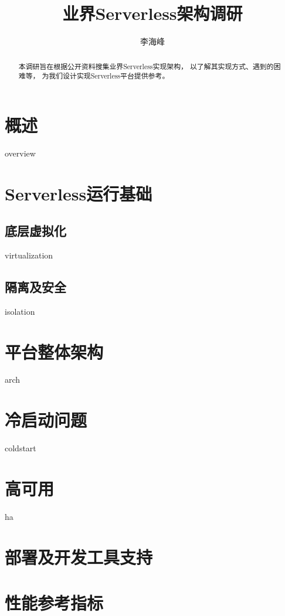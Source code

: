 \documentclass{scrartcl}
\title{业界Serverless架构调研}
\author{李海峰}
\begin{document}
\begin{titlingpage}
\maketitle
\begin{abstract}
    本调研旨在根据公开资料搜集业界Serverless实现架构，
    以了解其实现方式、遇到的困难等，
    为我们设计实现Serverless平台提供参考。
\end{abstract}
\end{titlingpage}
\tableofcontents

\section{概述}
{overview}
\section{Serverless运行基础}
\subsection{底层虚拟化}
{virtualization}
\subsection{隔离及安全}
{isolation}
\section{平台整体架构}
{arch}
\section{冷启动问题}
{coldstart}
\section{高可用}
{ha}
\section{部署及开发工具支持}
\section{性能参考指标}

\clearpage
\printbibliography 
\end{document}
